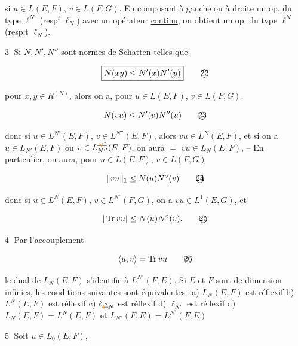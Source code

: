 si $u\in L(E,F)$, $v\in L(F,G)$.  En composant à gauche ou à droite un op.  du type $\ell^N$ (resp$^t$ $\ell_N$) avec un opérateur  \uline{continu}, on obtient un op. du type $\ell^N$ (resp.t $\ell_N$). 

\textcircled{3}  Si $N,N',N''$ sont  normes de Schatten telles que

\[
\boxed{N(xy)\leq N'(x)N'(y)}\tag*{\textcircled{22}}
\]

pour $x,y\in R^{(\underline N)}$, alors on a, pour $u\in L(E,F)$, $v\in L(F,G)$,

\[
N(vu)\leq N'(v)N''(u)\tag*{\textcircled{23}}
\]

donc si $u\in L^{N'}(E,F)$, $v\in L^{N''}(E,F)$, alors $vu\in L^N(E,F)$, et si on a  $u\in L_{N'}(E,F)$ ou $v\in L_{N''}^{\deleted{\unsure{N}}}(E,F)$, on aura $=$ $vu\in L_N(E,F)$, -- En particulier, on aura, pour $u\in L(E,F)$, $v\in L(F,G)$

\[
\lVert vu\rVert_1\leq N(u)N^\circ(v)\tag*{\textcircled{24}}
\]

donc si $u\in L^N(E,F)$, $v\in L^{N^\circ}(F,G)$, on a $vu\in L^1(E,G)$, et

\[
|\operatorname{Tr}vu|\leq N(u)N^\circ(v).\tag*{\textcircled{25}}
\]

\textcircled{4} Par l'accouplement 

\[
\langle u,v\rangle=\operatorname{Tr}vu\tag*{\textcircled{26}}
\]

le dual de $L_N(E,F)$ s'identifie à $L^{N^\circ}(F,E)$. Si $E$ et $F$ sont de dimension infinies,   les conditions suivantes sont équivalentes\,: a) $L_N(E,F)$ est réflexif b) $L^N(E,F)$ est réflexif  c) $\ell_{\deleted{\unsure{\ell}}N}$ est réflexif  d) $\ell_{N'}$ est réflexif   d) $L_N(E,F)=L^N(E,F)$ et $L_{N^\circ}(F,E)=L^{N^\circ}(F,E)$

\textcircled{5}  Soit $u\in L_0(E,F)$,  

